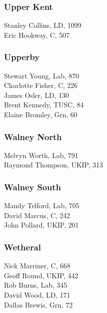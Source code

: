 \documentclass[a4paper,openany,10pt]{book}
\begin{document}
\subsubsection*{Upper Kent}



Stanley Collins, LD, 1099\\
Eric Hookway, C, 507\\


\subsubsection*{Upperby}



Stewart Young, Lab, 870\\
Charlotte Fisher, C, 226\\
James Osler, LD, 130\\
Brent Kennedy, TUSC, 84\\
Elaine Bromley, Grn, 60\\


\subsubsection*{Walney North}



Melvyn Worth, Lab, 791\\
Raymond Thompson, UKIP, 313\\


\subsubsection*{Walney South}



Mandy Telford, Lab, 705\\
David Marcus, C, 242\\
John Pollard, UKIP, 201\\


\subsubsection*{Wetheral}



Nick Marriner, C, 668\\
Geoff Round, UKIP, 442\\
Rob Burns, Lab, 345\\
David Wood, LD, 171\\
Dallas Brewis, Grn, 72\\
\end{document}
